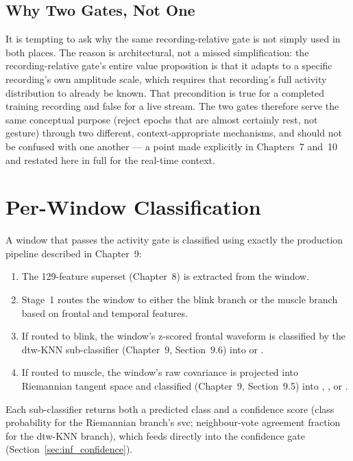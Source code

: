 \subsection{Why Two Gates, Not One}

It is tempting to ask why the same recording-relative gate is not
simply used in both places. The reason is architectural, not a
missed simplification: the recording-relative gate's entire value
proposition is that it adapts to a specific recording's own
amplitude scale, which requires that recording's full activity
distribution to already be known. That precondition is true for a
completed training recording and false for a live stream. The two
gates therefore serve the same conceptual purpose (reject epochs
that are almost certainly rest, not gesture) through two different,
context-appropriate mechanisms, and should not be confused with one
another --- a point made explicitly in Chapters~7 and~10 and
restated here in full for the real-time context.

\section{Per-Window Classification}
\label{sec:inf_classify}

A window that passes the activity gate is classified using exactly
the production pipeline described in Chapter~9:

\begin{enumerate}[leftmargin=*]
    \item The 129-feature superset (Chapter~8) is extracted from the
    window.
    \item Stage~1 routes the window to either the blink branch or
    the muscle branch based on frontal and temporal features.
    \item If routed to blink, the window's z-scored frontal
    waveform is classified by the \acrshort{dtw}-KNN sub-classifier
    (Chapter~9, Section~9.6) into  or
    .
    \item If routed to muscle, the window's raw covariance is
    projected into Riemannian tangent space and classified
    (Chapter~9, Section~9.5) into ,
    , or .
\end{enumerate}

Each sub-classifier returns both a predicted class and a confidence
score (class probability for the Riemannian branch's \acrshort{svc};
neighbour-vote agreement fraction for the \acrshort{dtw}-KNN
branch), which feeds directly into the confidence gate
(Section~\ref{sec:inf_confidence}).

